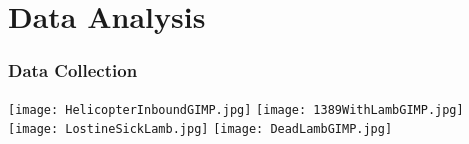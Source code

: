 \documentclass[fleqn,xcolor=table]{beamer}
\begin{document}
\section{Data Analysis}
\begin{frame}[t]
	\frametitle{\color{darkred} Data Collection}
	\hspace{.18in}
	\texttt{[image: HelicopterInboundGIMP.jpg]}
	\hspace{.09in}
	\texttt{[image: 1389WithLambGIMP.jpg]}\\
	\hspace{.18in}
	\texttt{[image: LostineSickLamb.jpg]}
	\hspace{.1in}
	\texttt{[image: DeadLambGIMP.jpg]} 
\end{frame}

\end{document}
